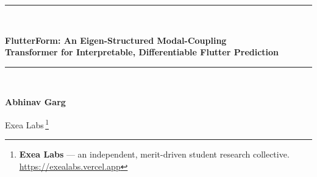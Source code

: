 \documentclass{article}
\begin{document}
\begin{center}
{\color{black}\rule{\linewidth}{1.4pt}}\\[6pt]
{\LARGE\bfseries FlutterForm: An Eigen-Structured Modal-Coupling\\[2pt]
Transformer for Interpretable, Differentiable Flutter Prediction\par}
\vskip 4pt
{\color{black}\rule{\linewidth}{0.5pt}}\\[14pt]
{\large\bfseries Abhinav Garg\par}
\vskip 2pt
{Exea Labs\,\footnote{\textbf{Exea Labs} --- an independent, merit-driven
student research collective. \;\url{https://exealabs.vercel.app}}\par}
\end{center}
\vskip 6pt

\begin{abstract}
\noindent Flutter --- the dynamic aeroelastic instability in which two
structural modes coalesce and oscillations grow unbounded --- is a
safety-critical design constraint whose prediction relies on expensive coupled
eigen-analyses, and whose recent neural surrogates are opaque black boxes. We
introduce \textbf{FlutterForm}, a $6{,}620$-parameter physics-structured model
that tokenizes a lifting surface into its structural modes, forms the
aerodynamic coupling operator by a pairwise \emph{outer-product} attention, and
reads the flutter boundary from a \emph{differentiable p--k eigen-solve}. On a
$50$k-section benchmark with a validated Theodorsen/p--k ground truth the
comparison is mixed: a capacity-matched black-box MLP is more accurate
\emph{in-distribution} ($1.4\%$ vs.\ $2.7\%$ median flutter-speed error) and more
data-efficient. The
value of physics structure lies elsewhere and is measurable: FlutterForm
extrapolates far better to unseen mass ratios (the black box's error grows up to
$10\times$ while FlutterForm's stays flat), recovers \emph{which} modes coalesce
($73\%$; a scalar regressor cannot), predicts the full V--g/V--f flutter diagram,
and --- being differentiable --- raises a section's flutter speed by $+37\%$
(verified by the exact solver) through gradient-based redesign. The physics core
reproduces the Hodges \& Pierce typical section to $0.9\%$ and the classic Goland
3-D wing to $0.1\%$. Code and data are open source.
\end{abstract}

\vskip 8pt
\end{document}
